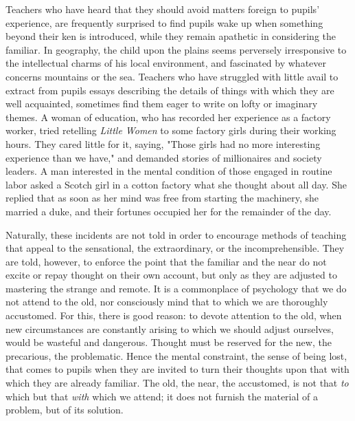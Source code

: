 \documentclass[showtrims,ustradepaper]{memoir}
\begin{document}

Teachers who have heard that they should avoid matters foreign to
pupils' experience, are frequently surprised to find pupils wake up when
something beyond their ken is introduced, while they remain apathetic in
considering the familiar. In geography, the child upon the plains seems
perversely irresponsive to the intellectual charms of his local
environment, and fascinated by whatever concerns mountains or the sea.
Teachers who have struggled with little avail to extract from pupils
essays describing the details of things with which they are well
acquainted, sometimes find them eager to write on lofty or imaginary
themes. A woman of education, who has recorded her experience as a
factory worker, tried retelling \emph{Little Women} to some factory
girls during their working hours. They cared little for it, saying,
"Those girls had no more interesting experience than we have," and
demanded stories of millionaires and society leaders. A man interested
in the mental condition of those engaged in routine labor asked a Scotch
girl in a cotton factory what she thought about all day. She replied
that as soon as her mind was free from starting the machinery, she
married a duke, and their fortunes occupied her for the remainder of the
day.


Naturally, these incidents are not told in order to encourage methods of
teaching that appeal to the
sensational,
the extraordinary, or the incomprehensible. They are told, however, to
enforce the point that the familiar and the near do not excite or repay
thought on their own account, but only as they are adjusted to mastering
the strange and remote. It is a commonplace of psychology that we do not
attend to the old, nor consciously mind that to which we are thoroughly
accustomed. For this, there is good reason: to devote attention to the
old, when new circumstances are constantly arising to which we should
adjust ourselves, would be wasteful and dangerous. Thought must be
reserved for the new, the precarious, the problematic. Hence the mental
constraint, the sense of being lost, that comes to pupils when they are
invited to turn their thoughts upon that with which they are already
familiar. The old, the near, the accustomed, is not that \emph{to} which
but that \emph{with} which we attend; it does not furnish the material
of a problem, but of its solution.

\end{document}
